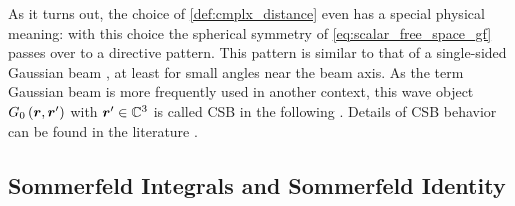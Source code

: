 As it turns out, the choice of \cref{def:cmplx_distance} even has a special
physical meaning:
with this choice the spherical symmetry of \eqref{eq:scalar_free_space_gf}
passes over to a directive pattern.
This pattern is similar to that of a single-sided Gaussian beam
\cite{hecht2017}, at least for small angles near the beam axis.
As the term Gaussian beam is more frequently used in another context, this
wave object $G_0 \left(\robs, \rsrc\right)$ with $\rsrc \in \C^3$ is called
\ac{CSB} in the following \cite{Hansen2009,Hansen2013}.
Details of \ac{CSB} behavior can be found in the literature
\cite{Deschamps1971,Keller1971,Couture1981}.








\subsection{Sommerfeld Integrals and Sommerfeld Identity}

